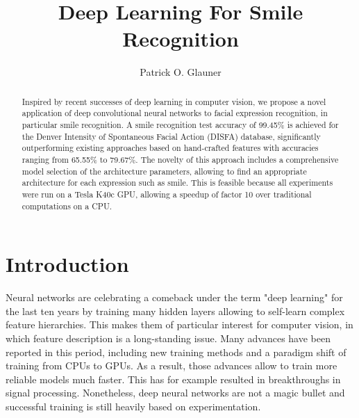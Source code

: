 \documentclass{ws-procs9x6}
\begin{document}
\title{Deep Learning For Smile Recognition}

\author{Patrick O. Glauner}

\address{Interdisciplinary Centre for Security, Reliability and Trust, University of Luxembourg\\ 
2721 Luxembourg, Luxembourg \\
Email: patrick.glauner@uni.lu \\
snt.uni.lu \\
}


\begin{abstract}
Inspired by recent successes of deep learning in computer vision, we propose a novel application of deep convolutional neural networks to facial expression recognition, in particular smile recognition.
A smile recognition test accuracy of 99.45\% is achieved for the Denver Intensity of Spontaneous Facial Action (DISFA) database, significantly outperforming existing approaches based on hand-crafted features with accuracies ranging from 65.55\% to 79.67\%. The novelty of this approach includes a comprehensive model selection of the architecture parameters, allowing to find an appropriate architecture for each expression such as smile. This is feasible because all experiments were run on a Tesla K40c GPU, allowing a speedup of factor 10 over traditional computations on a CPU.
\end{abstract}


\bodymatter

\section{Introduction}
Neural networks are celebrating a comeback under the term "deep learning" for the last ten years by training many hidden layers allowing to self-learn complex feature hierarchies. This makes them of particular interest for computer vision, in which feature description is a long-standing issue.
Many advances have been reported in this period, including new training methods and a paradigm shift of training from CPUs to GPUs. As a result, those advances allow to train more reliable models much faster. This has for example resulted in breakthroughs\cite{hinton_speech} in signal processing. Nonetheless, deep neural networks are not a magic bullet and successful training is still heavily based on experimentation.
\end{document}
